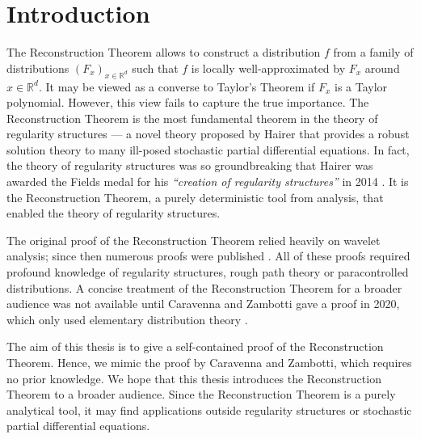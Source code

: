\chapter{Introduction} 

The Reconstruction Theorem allows to construct a distribution $f$ from a family of distributions $(F_x)_{x \in \mathbb{R}^d}$ such that $f$ is locally well-approximated by $F_x$ around $x \in \mathbb{R}^d$. It may be viewed as a converse to Taylor's Theorem if $F_x$ is a Taylor polynomial. However, this view fails to capture the true importance. The Reconstruction Theorem is the most fundamental theorem in the theory of regularity structures --- a novel theory proposed by Hairer \cite{hairer2014theory} that provides a robust solution theory to many ill-posed stochastic partial differential equations. In fact, the theory of regularity structures was so groundbreaking that Hairer was awarded the Fields medal for his \emph{``creation of regularity structures''} in 2014 \cite{FieldsMedalHairer}. It is the Reconstruction Theorem, a purely deterministic tool from analysis, that enabled the theory of regularity structures.

The original proof of the Reconstruction Theorem relied heavily on wavelet analysis; since then numerous proofs were published \cite{hairer2017reconstruction, otto2019quasilinear, gubinelli2015paracontrolled, martin2020littlewood, singh2018elementary}. All of these proofs required profound knowledge of regularity structures, rough path theory or paracontrolled distributions. A concise treatment of the Reconstruction Theorem for a broader audience was not available until Caravenna and Zambotti gave a proof in 2020, which only used elementary distribution theory \cite{caravenna2021hairer}. 

The aim of this thesis is to give a self-contained proof of the Reconstruction Theorem. Hence, we mimic the proof by Caravenna and Zambotti, which requires no prior knowledge. We hope that this thesis introduces the Reconstruction Theorem to a broader audience. Since the Reconstruction Theorem is a purely analytical tool, it may find applications outside regularity structures or stochastic partial differential equations. 

